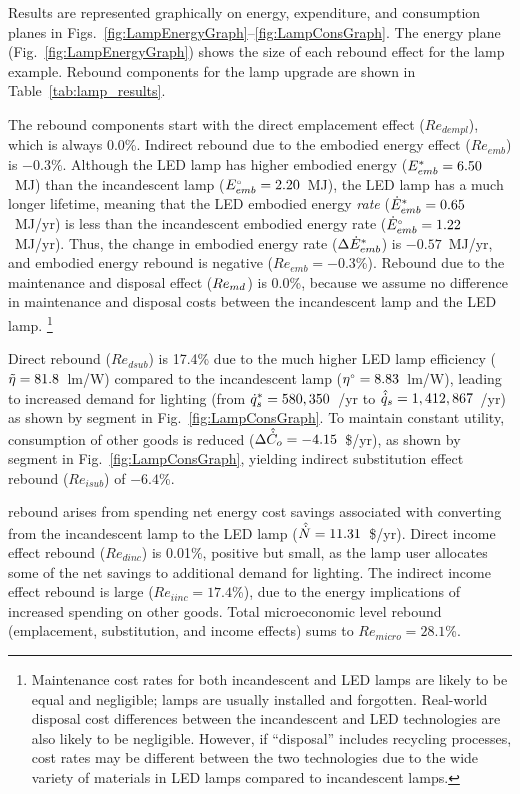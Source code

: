 \documentclass[12pt]{article}\usepackage[]{graphicx}\usepackage[]{xcolor}
\begin{document}
Results are represented graphically on energy, expenditure, and consumption planes
in Figs.~\ref{fig:LampEnergyGraph}--\ref{fig:LampConsGraph}.
The energy plane (Fig.~\ref{fig:LampEnergyGraph})
shows the size of each rebound effect
for the lamp example.
Rebound components for the lamp upgrade are shown in Table~\ref{tab:lamp_results}.

The \empleffect{} rebound components start with
the direct emplacement effect ($Re_{dempl}$),
which is always $0.0$\%.
Indirect rebound due to the embodied energy effect
($Re_{emb}$) is $-0.3$\%.
Although the LED lamp has higher embodied energy 
(${E}^*_{emb} = 6.50$~MJ)
than the incandescent lamp 
(${}{E}^{\scriptscriptstyle \circ}_{emb} = 2.20$~MJ),
the LED lamp has a much longer lifetime,
meaning that the LED embodied energy \emph{rate}
(${\dot{E}}^*_{emb} = 0.65$~MJ/yr)
is less than the incandescent embodied energy rate
(${}{\dot{E}}^{\scriptscriptstyle \circ}_{emb} = 1.22$~MJ/yr).
Thus, the change in embodied energy rate ($\Delta {\dot{E}}^*_{emb}$)
is $-0.57$~MJ/yr, 
and embodied energy rebound is negative
($Re_{emb} = -0.3$\%).
Rebound due to the maintenance and disposal effect
($Re_{md}$) is 0.0\%,
because we assume no difference in maintenance and disposal costs between 
the incandescent lamp and the LED lamp.%
\footnote{
  Maintenance cost rates for both incandescent and LED lamps are likely to be equal 
  and negligible;
  lamps are usually installed and forgotten.
  Real-world disposal cost differences between the incandescent and LED technologies
  are also likely to be negligible. 
  However, if ``disposal'' includes recycling processes, 
  cost rates may be different between the two technologies
  due to the wide variety of materials in LED lamps compared to incandescent lamps.
}

Direct \subeffect{} rebound 
($Re_{dsub}$) is 17.4\%
due to the much higher LED lamp efficiency
($\tilde{\eta} = 81.8$~lm/W) 
compared to the incandescent lamp
(${}{\eta}^{\scriptscriptstyle \circ} = 8.83$~lm/W),
leading to increased demand for lighting
(from ${\dot{q}}^*_s = 580,350$~\lmhr/yr
to $\hat{\dot{q}}_s = 1,412,867$~\lmhr/yr)
as shown by segment \chat{} in Fig.~\ref{fig:LampConsGraph}.
To maintain constant utility, 
consumption of other goods is reduced
($\Delta \hat{\dot{C}}_o = -4.15$~\$/yr), 
as shown by segment \starc{} in Fig.~\ref{fig:LampConsGraph},
yielding indirect substitution effect rebound
($Re_{isub}$) of $-6.4$\%.

\Inceffect{} rebound arises from spending net energy cost savings
associated with converting from the incandescent lamp to the LED lamp
($\hat{\dot{N}} = 11.31$~\$/yr).
Direct income effect rebound 
($Re_{dinc}$) is 0.01\%,
positive but small, 
as the lamp user allocates
some of the net savings to additional demand for lighting.
The indirect income effect rebound is large
($Re_{iinc} = 17.4$\%),
due to the energy implications of increased spending on other goods.
Total microeconomic level rebound (emplacement, substitution, and income effects)
sums to $Re_{micro} = 28.1$\%.
\end{document}
